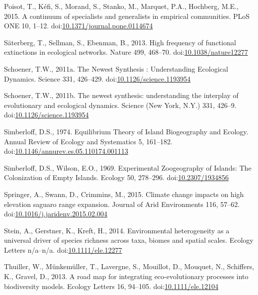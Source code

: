 \hypertarget{ref-Poisot2015c}{}
Poisot, T., Kéfi, S., Morand, S., Stanko, M., Marquet, P.A., Hochberg,
M.E., 2015. A continuum of specialists and generalists in empirical
communities. PLoS ONE 10, 1--12.
doi:\href{https://doi.org/10.1371/journal.pone.0114674}{10.1371/journal.pone.0114674}

\hypertarget{ref-Saterberg2013}{}
Säterberg, T., Sellman, S., Ebenman, B., 2013. High frequency of
functional extinctions in ecological networks. Nature 499, 468--70.
doi:\href{https://doi.org/10.1038/nature12277}{10.1038/nature12277}

\hypertarget{ref-Schoener2011a}{}
Schoener, T.W., 2011a. The Newest Synthesis : Understanding Ecological
Dynamics. Science 331, 426--429.
doi:\href{https://doi.org/10.1126/science.1193954}{10.1126/science.1193954}

\hypertarget{ref-Schoener2011}{}
Schoener, T.W., 2011b. The newest synthesis: understanding the interplay
of evolutionary and ecological dynamics. Science (New York, N.Y.) 331,
426--9.
doi:\href{https://doi.org/10.1126/science.1193954}{10.1126/science.1193954}

\hypertarget{ref-Simberloff1974a}{}
Simberloff, D.S., 1974. Equilibrium Theory of Island Biogeography and
Ecology. Annual Review of Ecology and Systematics 5, 161--182.
doi:\href{https://doi.org/10.1146/annurev.es.05.110174.001113}{10.1146/annurev.es.05.110174.001113}

\hypertarget{ref-Simberloff1969}{}
Simberloff, D.S., Wilson, E.O., 1969. Experimental Zoogeography of
Islands: The Colonization of Empty Islands. Ecology 50, 278--296.
doi:\href{https://doi.org/10.2307/1934856}{10.2307/1934856}

\hypertarget{ref-Springer2015}{}
Springer, A., Swann, D., Crimmins, M., 2015. Climate change impacts on
high elevation saguaro range expansion. Journal of Arid Environments
116, 57--62.
doi:\href{https://doi.org/10.1016/j.jaridenv.2015.02.004}{10.1016/j.jaridenv.2015.02.004}

\hypertarget{ref-Stein2014}{}
Stein, A., Gerstner, K., Kreft, H., 2014. Environmental heterogeneity as
a universal driver of species richness across taxa, biomes and spatial
scales. Ecology Letters n/a--n/a.
doi:\href{https://doi.org/10.1111/ele.12277}{10.1111/ele.12277}

\hypertarget{ref-Thuiller2013}{}
Thuiller, W., Münkemüller, T., Lavergne, S., Mouillot, D., Mouquet, N.,
Schiffers, K., Gravel, D., 2013. A road map for integrating
eco-evolutionary processes into biodiversity models. Ecology Letters 16,
94--105. doi:\href{https://doi.org/10.1111/ele.12104}{10.1111/ele.12104}

